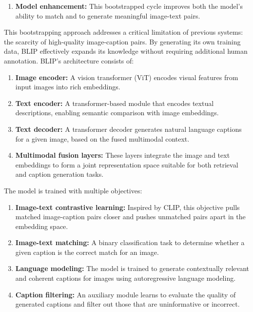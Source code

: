 \documentclass[conference]{IEEEtran}
\begin{document}
\begin{enumerate}
\begin{enumerate}
    \item \textbf{Model enhancement:} This bootstrapped cycle improves both the model’s ability to match and to generate meaningful image-text pairs.
\end{enumerate}

This bootstrapping approach addresses a critical limitation of previous systems: the scarcity of high-quality image-caption pairs. By generating its own training data, BLIP effectively expands its knowledge without requiring additional human annotation.
BLIP's architecture consists of:

\begin{enumerate}
    \item \textbf{Image encoder:} A vision transformer (ViT) encodes visual features from input images into rich embeddings.
    
    \item \textbf{Text encoder:} A transformer-based module that encodes textual descriptions, enabling semantic comparison with image embeddings.
    
    \item \textbf{Text decoder:} A transformer decoder generates natural language captions for a given image, based on the fused multimodal context.
    
    \item \textbf{Multimodal fusion layers:} These layers integrate the image and text embeddings to form a joint representation space suitable for both retrieval and caption generation tasks.
\end{enumerate}

The model is trained with multiple objectives:

\begin{enumerate}
    \item \textbf{Image-text contrastive learning:} Inspired by CLIP, this objective pulls matched image-caption pairs closer and pushes unmatched pairs apart in the embedding space.
    
    \item \textbf{Image-text matching:} A binary classification task to determine whether a given caption is the correct match for an image.
    
    \item \textbf{Language modeling:} The model is trained to generate contextually relevant and coherent captions for images using autoregressive language modeling.
    
    \item \textbf{Caption filtering:} An auxiliary module learns to evaluate the quality of generated captions and filter out those that are uninformative or incorrect.
\end{enumerate}


\end{enumerate}
\end{document}
